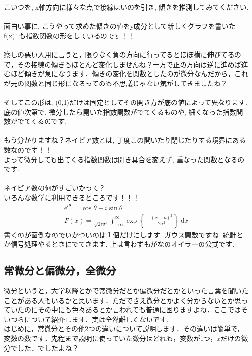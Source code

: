 \documentclass[11pt,a4paper,uplatex]{ujreport}
\begin{document}
こいつを, x軸方向に様々な点で接線ぽいのを引き, 傾きを推測してみてください. \\
\\
面白い事に, こうやって求めた傾きの値をy成分として新しくグラフを書いた f(x)' も指数関数の形をしているのです！！\\
\\
察しの悪い人用に言うと，限りなく負の方向に行ってるとほぼ横に伸びてるので，その接線の傾きもほとんど変化しませんね？一方で正の方向は逆に進めば進むほど傾きが急になります．傾きの変化を関数としたのが微分なんだから，これが元の関数と同じ形になるってのも不思議じゃない気がしてきましたね？\\
\\
そしてこの形は, (0,1)だけは固定としてその開き方が底の値によって異なります. \\
底の値次第で, 微分したら開いた指数関数がでてくるものや, 細くなった指数関数がでてくるのです.\\
\\
もう分かりますね？ネイピア数とは, 丁度この開いたり閉じたりする境界にある数なのです！！\\
よって微分しても出てくる指数関数は開き具合を変えず, 重なった関数となるのです.\\
\\
ネイピア数の何がすごいかって？\\
いろんな数学に利用できるところです！！！\\
\begin{eqnarray}
\mathrm{e}^{i\theta} = \cos\theta + i\sin\theta \\
F(x)=\frac{1}{\sqrt{2\pi \sigma^2}}\int_{-\infty}^{\infty}\exp{\left\{-\frac{(x-\mu)^2}{2\sigma^2}\right\}}\ \mathrm{d}x
\end{eqnarray}
書くのが面倒なのでいかついのは１個だけにします. ガウス関数ですね. 統計とか信号処理やるときにでてきます. 上は言わずもがなのオイラーの公式です.\\

\subsection{常微分と偏微分，全微分}
微分というと，大学以降とかで常微分だとか偏微分だとかといった言葉を聞いたことがある人もいるかと思います．ただでさえ微分とかよく分からないとか思っていたのにその中にも色々あるとか言われても普通に困りますよね．ここではそいつらについて紹介します．実は全然難しくないです．\\

はじめに，常微分とその他2つの違いについて説明します．その違いは簡単で，変数の数です．先程まで説明に使っていた微分はどれも，変数が1つ，$x$だけの微分でした．でしたよね？
\end{document}
